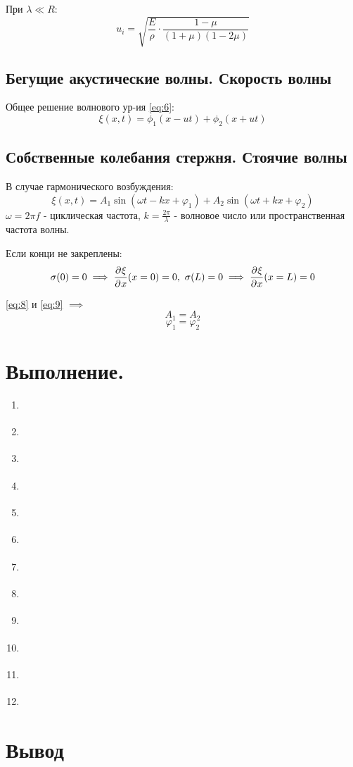 \documentclass[a4paper,12pt]{article} %
\begin{document}
При $\lambda \ll R$:
\[ u_i = \sqrt{\frac{E}{\rho} \cdot \frac{1-\mu}{(1+\mu)(1-2\mu)}} \]
\label{eq:ui}

\subsection{Бегущие акустические волны. Скорость волны}
Общее решение волнового ур-ия \eqref{eq:6}:
\begin{equation}
  \xi(x,t) = \phi_1(x-ut) + \phi_2(x+ut)
  \label{eq:7}
\end{equation}

\subsection{Собственные колебания стержня. Стоячие волны}
В случае гармонического возбуждения:
\begin{equation}
  \xi(x,t) = A_1 \sin{(\omega t - kx + \varphi_1)} + 
  A_2 \sin{(\omega t + kx + \varphi_2)}
  \label{eq:8}
\end{equation}
$\omega = 2\pi f$ - циклическая частота, 
$k = \frac{2\pi}{\lambda}$ - волновое число или пространственная частота волны.

Если конци не закреплены:
\begin{equation}
  \sigma(0) = 0 \implies \partderiv{\xi}{x} (x = 0) = 0,\ 
  \sigma(L) = 0 \implies \partderiv{\xi}{x} (x = L) = 0
  \label{eq:9}
\end{equation}

\eqref{eq:8} и \eqref{eq:9} $\implies$
\begin{equation}
  A_1 = A_2 \label{eq:10}
\end{equation}
\begin{equation}
  \varphi_1 = \varphi_2 \label{eq:10}
\end{equation}

\section{Выполнение.} \label{Выполнение}
\begin{enumerate}
  \item \label{Выполнение:1}
  \item \label{Выполнение:2}
  \item \label{Выполнение:3}
  \item \label{Выполнение:4}
  \item \label{Выполнение:5}
  \item \label{Выполнение:6}
  \item \label{Выполнение:7}
  \item \label{Выполнение:8}
  \item \label{Выполнение:9}
  \item \label{Выполнение:10}
  \item \label{Выполнение:11}
  \item \label{Выполнение:12}
\end{enumerate}

\section{Вывод}
\end{document}
